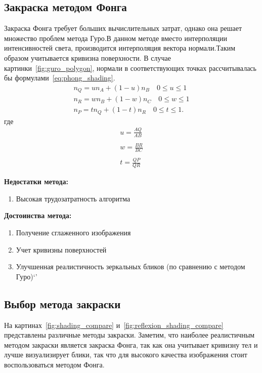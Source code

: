 \documentclass[a4paper,14pt,unknownkeysallowed]{extreport}
\begin{document}
\subsection{Закраска методом Фонга}
Закраска Фонга требует больших вычислительных затрат, однако она решает множество проблем метода Гуро.В данном методе вместо интерполяции интенсивностей света,
производится интерполяция вектора нормали.Таким образом учитывается кривизна поверхности.
В случае картинки~\ref{fig:guro_polygon}, нормали в соответствующих точках рассчитывалась бы формулами~\ref{eq:phong_shading}. \cite{Rodgers}
\begin{equation}
	\label{eq:phong_shading}
	\begin{aligned}
	n_Q = un_A + (1-u)n_B  \quad 0 \leq u \leq 1 \\
	n_R = wn_B + (1-w)n_C  \quad 0 \leq w \leq 1 \\
	n_P = tn_Q + (1-t)n_R  \quad 0 \leq t \leq 1.
	\end{aligned}
\end{equation}
где
\begin{equation}
	\begin{aligned}
	u = \frac{AQ}{AB} \\\\
	w = \frac{BR}{BC} \\\\
	t = \frac{QP}{QR} 
	\end{aligned}
\end{equation}

\textbf{Недостатки метода:}
\begin{enumerate} 
	\item Высокая трудозатратность алгоритма
\end{enumerate}

\textbf{Достоинства метода:}
\begin{enumerate}
	\item Получение сглаженного изображения
	\item Учет кривизны поверхностей
	\item Улучшенная реалистичность зеркальных бликов (по сравнению с методом Гуро)`'
\end{enumerate}


\subsection{Выбор метода закраски}
На картинах~\ref{fig:shading_compare} и~\ref{fig:reflexion_shading_compare} представлены различные методы закраски. Заметим, что наиболее реалистичным методом закраски является
закраска Фонга, так как она учитывает кривизну тел и лучше визуализирует блики, так что для высокого качества изображения стоит воспользоваться методом Фонга.
\end{document}
